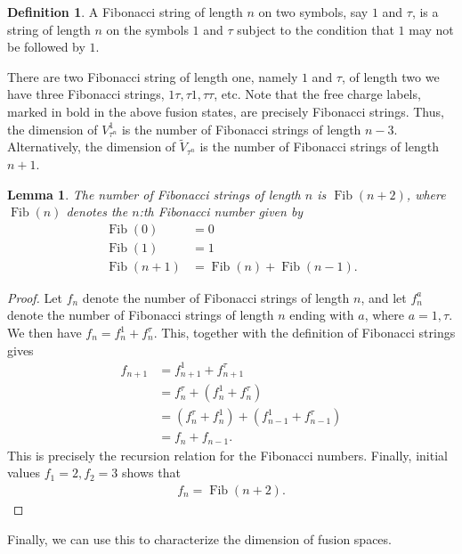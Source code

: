 \documentclass[a4paper,10pt,oneside]{book}
\theoremstyle{plain}
\newtheorem{lemma}[theorem]{Lemma}
\theoremstyle{definition}
\newtheorem{definition}{Definition}[section]
\theoremstyle{remark}
\DeclareMathOperator{\Fib}{Fib}
\begin{document}
\begin{definition}\label{def:fibonacci strings}
  A Fibonacci string of length $n$ on two symbols, say $1$ and $τ$, is a string of length $n$ on the symbols $1$ and $τ$ subject to the condition that $1$ may not be followed by $1$.
\end{definition}

There are two Fibonacci string of length one, namely $1$ and $τ$, of length two we have three Fibonacci strings, $1τ, τ1, ττ$, etc. Note that the free charge labels, marked in bold in the above fusion states, are precisely Fibonacci strings. Thus, the dimension of $V_{τ^n}^1$ is the number of Fibonacci strings of length $n-3$. Alternatively, the dimension of $\widetilde{V}_{τ^n}$ is the number of Fibonacci strings of length $n+1$.

\begin{lemma}\label{lemma:fibonacci string length}
  The number of Fibonacci strings of length $n$ is $\Fib(n + 2)$, where $\Fib(n)$ denotes the $n$:th Fibonacci number given by
  \begin{align*}
    \Fib(0) &= 0 \\
    \Fib(1) &= 1 \\
    \Fib(n+1) &= \Fib(n) + \Fib(n-1).
  \end{align*}
\end{lemma}

\begin{proof}
  Let $f_n$ denote the number of Fibonacci strings of length $n$, and let $f^a_n$ denote the number of Fibonacci strings of length $n$ ending with $a$, where $a = 1, τ$. We then have $f_n = f^1_n + f^τ_n$. This, together with the definition of Fibonacci strings gives
  \begin{align*}
    f_{n+1}
    &= f^1_{n+1} + f^τ_{n+1} \\
    &= f^τ_n + \left(f^1_n + f^τ_n\right) \\
    &= \left(f^τ_n + f^1_n\right) + \left(f^1_{n-1} + f^τ_{n-1}\right) \\
    &= f_n + f_{n-1}.
  \end{align*}
  This is precisely the recursion relation for the Fibonacci numbers. Finally, initial values $f_1 = 2, f_2 = 3$ shows that
  \begin{align*}
    f_n = \Fib(n+2).
  \end{align*}
\end{proof}

Finally, we can use this to characterize the dimension of fusion spaces.
\end{document}
